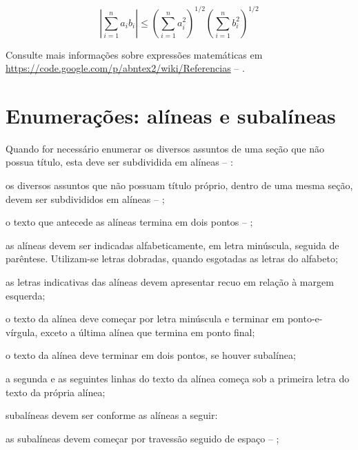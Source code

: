 \[
    \left|\sum_{i=1}^n a_ib_i\right|
    \le
    \left(\sum_{i=1}^n a_i^2\right)^{1/2}
    \left(\sum_{i=1}^n b_i^2\right)^{1/2}
\]

Consulte mais informações sobre expressões matemáticas em
\url{https://code.google.com/p/abntex2/wiki/Referencias} -- \showfont.


\section{Enumerações: alíneas e subalíneas}

Quando for necessário enumerar
os diversos assuntos de uma seção que não possua título, esta deve ser
subdividida em alíneas -- \showfont \cite[4.2]{NBR6024:2012}:

\begin{alineas}

    \item os diversos assuntos que não possuam título próprio, dentro de uma mesma
    seção, devem ser subdivididos em alíneas -- \showfont;

    \item o texto que antecede as alíneas termina em dois pontos -- \showfont;
    \item as alíneas devem ser indicadas alfabeticamente, em letra minúscula,
    seguida de parêntese. Utilizam-se letras dobradas, quando esgotadas as
    letras do alfabeto;

    \item as letras indicativas das alíneas devem apresentar recuo em relação à
    margem esquerda;

    \item o texto da alínea deve começar por letra minúscula e terminar em
    ponto-e-vírgula, exceto a última alínea que termina em ponto final;

    \item o texto da alínea deve terminar em dois pontos, se houver subalínea;

    \item a segunda e as seguintes linhas do texto da alínea começa sob a
    primeira letra do texto da própria alínea;

    \item subalíneas \cite[4.3]{NBR6024:2012} devem ser conforme as alíneas a
    seguir:

    \begin{alineas}
        \item as subalíneas devem começar por travessão seguido de espaço -- \showfont;


\end{alineas}
\end{alineas}
